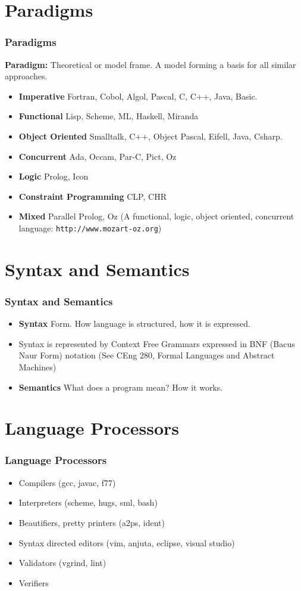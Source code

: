 \section{Paradigms}
\begin{frame}
\frametitle{Paradigms}
\textbf{Paradigm:} Theoretical or model frame. A model forming a basis for all
similar approaches.
\begin{itemize}
 \item \textbf{Imperative} Fortran, Cobol, Algol, Pascal, C, C++, Java, Basic.
\item \textbf{Functional} Lisp, Scheme, ML, Haskell, Miranda
\item \textbf{Object Oriented} Smalltalk, C++, Object Pascal, Eifell, Java, Csharp.
\item \textbf{Concurrent} Ada, Occam, Par-C, Pict, Oz
\item \textbf{Logic} Prolog, Icon
\item \textbf{Constraint Programming} CLP, CHR
\item \textbf{Mixed} Parallel Prolog, Oz (A functional, logic, object oriented, concurrent language: {\tt http://www.mozart-oz.org})
\end{itemize}

\end{frame}

\section{Syntax and Semantics}
\begin{frame}
 \frametitle{Syntax and Semantics}
\begin{itemize}
 \item \textbf{Syntax} Form. How language is structured, how it is expressed.
\item Syntax is represented by Context Free Grammars expressed in BNF (Bacus Naur Form) notation (See CEng 280, Formal Languages and Abstract Machines)
\pause
\item \textbf{Semantics} What does a program mean? How it works.
\end{itemize}
\end{frame}

\section{Language Processors}
\begin{frame}
\frametitle{Language Processors}
\begin{itemize}
\item Compilers (gcc, javac, f77)
\item Interpreters (scheme, hugs, sml, bash)
\item Beautifiers, pretty printers (a2ps, ident)
\item Syntax directed editors (vim, anjuta, eclipse, visual studio)
\item Validators (vgrind, lint)
\item Verifiers 
\end{itemize}
\end{frame}

